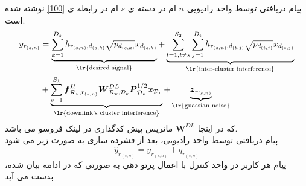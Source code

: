 پیام دریافتی توسط واحد رادیویی  $n$ ام در دسته ی $s$ ام در رابطه ی \eqref{100} نوشته شده است.
 \begin{equation} \label{100}
\begin{split}
y_{r_{(s,n)}} &=  \underbrace{ \sum_{k=1}^{D_s} h_{r_{(s,n)},d_{(s,k)}} \sqrt{p_{d_{(s,k)}}}  x_{d_{(s,k)}} }_{\text{\lr{desired signal}}}
+ \underbrace{\sum_{t=1,t\neq s}^{S_2} \sum_{j=1}^{D_t} h_{r_{(s,n)},d_{(t,j)}} \sqrt{p_{d_{(t,j)}}} x_{d_{(t,j)}}}_{\text{\lr{inter-cluster interference}}}\\
&+ \underbrace{\sum_{v=1}^{S_1}  \boldsymbol{f}_{\mathcal{R}_v, r_{(s,n)}}^H  \boldsymbol{W}_{\mathcal{R}_v,\mathcal{D}_v}^{DL} \boldsymbol{P}_{\mathcal{D}_v}^{1/2}  \boldsymbol{x}_{\mathcal{D}_v}}_{\text{\lr{downlink's cluster interference}}}
 + \underbrace{\boldsymbol{z}_{r_{(s,n)}}}_{\text{\lr{guassian noise}}}
 \end{split}
\end{equation}
که در اینجا $\boldsymbol{W}^{DL}$ ماتریس پیش کدگذاری در لینک فروسو می باشد.\\
پیام دریافتی توسط واحد رادیویی، بعد از فشرده سازی به صورت زیر می شود
\begin{equation}
\hat{y}_{r_{(s,n)}} = y_{r_{(s,n)}} + q_{r_{(s,n)}} 
\end{equation}
پیام هر کاربر در واحد کنترل با اعمال پرتو دهی  به صورتی که در ادامه بیان شده، بدست می آید
